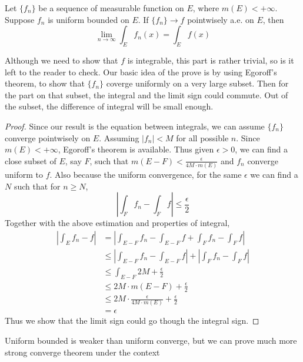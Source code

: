 \documentclass[lang=en, 12pt]{elegantbook}
\begin{document}
    \begin{theorem}
        Let $\{f_n\}$ be a sequence of measurable function on $E$, where $m(E)<+\infty$. Suppose $f_n$ is uniform bounded on $E$. 
    If $\{f_n\} \to f$ pointwisely a.e. on $E$, then 
    $$\lim_{n \to \infty} \int_E f_n(x) = \int_E f(x) $$
    \end{theorem}\par
        Although we need to show that $f$ is integrable, this part is rather trivial, so is it left to the reader to check.
        Our basic idea of the prove is by using Egoroff's theorem, to show that $\{f_n\}$ coverge uniformly on a very large subset.
    Then for the part on that subset, the integral and the limit sign could commute. Out of the subset, the difference of integral 
    will be small enough.
    \begin{proof}
        Since our result is the equation between integrals, we can assume $\{f_n\}$ converge pointwisely on $E$. Assuming $|f_n| < M$ 
    for all possible $n$. Since $m(E)< +\infty$, Egoroff's theorem is available. Thus given $\epsilon >0 $, 
    we can find a close subset of $E$, say $F$, such that $m(E - F) < \frac{\epsilon}{ 4M \cdot m(E) }$  and $f_n$ converge uniform to 
    $f$. Also because the uniform convergence, for the same $\epsilon$ we can find a $N$ such that for $n\geq N$, 
    $$|\int_F f_n -\int_F f| \leq \frac{\epsilon}{2}$$
    Together with the above estimation and properties of integral,
        \begin{equation*}
            \begin{aligned}
                |\int_E f_n - f| &= |\int_{E-F} f_n - \int_{E-F} f + \int_{F} f_n -\int_{F} f|\\
                &\leq |\int_{E-F} f_n - \int_{E-F} f| + |\int_{F} f_n -\int_{F} f|\\
                &\leq \int_{E-F} 2M  + \frac{\epsilon}{2}\\
                &\leq 2M \cdot m(E-F) +\frac{\epsilon}{2}\\
                &\leq 2M \cdot \frac{\epsilon}{ 4M \cdot m(E) } +\frac{\epsilon}{2}\\
                &= \epsilon
            \end{aligned}
        \end{equation*}
    Thus we show that the limit sign could go though the integral sign.
    \end{proof}
        Uniform bounded is weaker than uniform converge, but we can prove much more strong converge theorem under the context 
\end{document}

